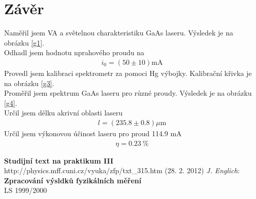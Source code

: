 \documentclass[a4paper,12pt]{article}
\begin{document}
\section{Závěr}
Naměřil jsem VA a světelnou charakteristiku GaAs laseru. Výsledek je na obrázku \ref{g1}. \\
Odhadl jsem hodnotu nprahového proudu na
\begin{eqnarray}
i_0=(50\pm 10)\mbox{mA}
\end{eqnarray}
Provedl jsem kalibraci spektrometr za pomoci Hg výbojky. Kalibrační křivka je na obrázku \ref{g3}. \\
Proměřil jsem spektrum GaAs laseru pro různé proudy. Výsledek je na obrázku \ref{g4}. \\
Určil jsem délku akrivní oblasti laseru
\begin{eqnarray}
l=(235.8 \pm 0.8)\mu\mbox{m}
\end{eqnarray}
Určil jsem výkonovou účinost laseru pro proud 114.9 mA
\begin{eqnarray}
\eta = 0.23\ \%
\end{eqnarray}

\begin{thebibliography}{5}
	 \textbf{Studijní text na praktikum III} \\http://physics.mff.cuni.cz/vyuka/zfp/txt\_315.htm (28. 2. 2012)
     \emph{J. Englich}: \textbf{Zpracování výsldků fyzikálních měření} \\ LS 1999/2000
\end{thebibliography}
\end{document}

